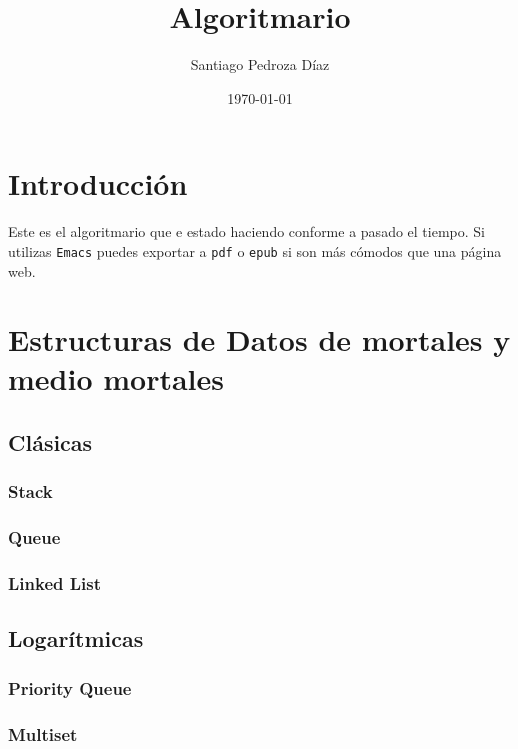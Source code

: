 \documentclass[11pt]{article}
\author{Santiago Pedroza Díaz}
\date{\today}
\title{Algoritmario}
\begin{document}
\maketitle
\tableofcontents


\section{Introducción}
\label{sec:org92cb10b}

Este es el algoritmario que e estado haciendo conforme a pasado el tiempo.
Si utilizas \texttt{Emacs} puedes exportar a \texttt{pdf} o \texttt{epub} si son más cómodos que una página
web.

\section{Estructuras de Datos de mortales y medio mortales}
\label{sec:orgf2092aa}

\subsection{Clásicas}
\label{sec:org2166eb8}

\subsubsection{Stack}
\label{sec:org0c90c3b}

\subsubsection{Queue}
\label{sec:org85f1cd5}

\subsubsection{Linked List}
\label{sec:org9e79f8c}

\subsection{Logarítmicas}
\label{sec:org3768528}

\subsubsection{Priority Queue}
\label{sec:orgb34a23e}

\subsubsection{Multiset}
\label{sec:orgd1d89e6}
\end{document}
